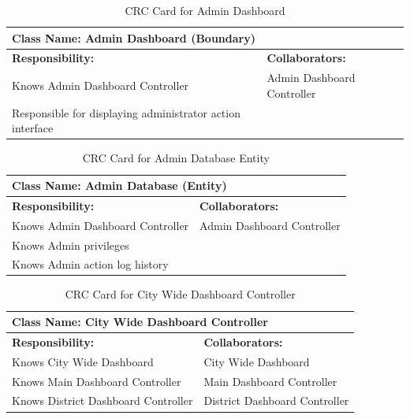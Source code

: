 \documentclass[]{article}
\begin{document}
\begin{table}[H]
    \centering
    \caption{CRC Card for Admin Dashboard}
    \vspace{1mm}
    \begin{tabular}{|p{7.5cm}|p{7.5cm}|}
    \hline 
      \multicolumn{2}{|l|}{\textbf{Class Name: Admin Dashboard (Boundary)}} \\
    \hline
    \textbf{Responsibility:} & \textbf{Collaborators:} \\
    \hline
        Knows Admin Dashboard Controller & Admin Dashboard Controller \\
        Responsible for displaying administrator action interface \newline & \\
    \hline
    \end{tabular}
\end{table}  
\begin{table}[H]
    \centering
    \caption{CRC Card for Admin Database Entity}
    \vspace{1mm}
    \begin{tabular}{|p{7.5cm}|p{7.5cm}|}
    \hline 
      \multicolumn{2}{|l|}{\textbf{Class Name: Admin Database (Entity)}} \\
    \hline
    \textbf{Responsibility:} & \textbf{Collaborators:} \\
    \hline
        Knows Admin Dashboard Controller & Admin Dashboard Controller \\
        Knows Admin privileges & \\
        Knows Admin action log history \newline & \\
    \hline
    \end{tabular}
\end{table}
\begin{table}[H]
    \centering
    \caption{CRC Card for City Wide Dashboard Controller}
    \vspace{1mm}
    \begin{tabular}{|p{7.5cm}|p{7.5cm}|}
    \hline 
      \multicolumn{2}{|l|}{\textbf{Class Name: City Wide Dashboard Controller}} \\
    \hline
    \textbf{Responsibility:} & \textbf{Collaborators:} \\
    \hline
        Knows City Wide Dashboard & City Wide Dashboard\\
        Knows Main Dashboard Controller & Main Dashboard Controller\\
        Knows District Dashboard Controller \newline & District Dashboard Controller \\
    \hline
    \end{tabular}
\end{table}
\end{document}
